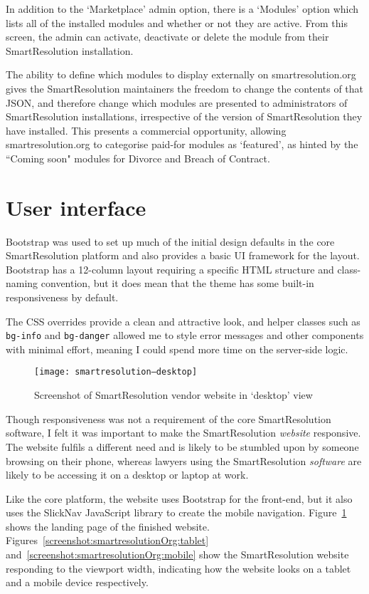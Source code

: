 In addition to the `Marketplace' admin option, there is a `Modules' option which lists all of the installed modules and whether or not they are active. From this screen, the admin can activate, deactivate or delete the module from their SmartResolution installation.

The ability to define which modules to display externally on smartresolution.org gives the SmartResolution maintainers the freedom to change the contents of that JSON, and therefore change which modules are presented to administrators of SmartResolution installations, irrespective of the version of SmartResolution they have installed. This presents a commercial opportunity, allowing smartresolution.org to categorise paid-for modules as `featured', as hinted by the ``Coming soon" modules for Divorce and Breach of Contract.

\section{User interface}

Bootstrap was used to set up much of the initial design defaults in the core SmartResolution platform and also provides a basic UI framework for the layout. Bootstrap has a 12-column layout requiring a specific HTML structure and class-naming convention, but it does mean that the theme has some built-in responsiveness by default.

The CSS overrides provide a clean and attractive look, and helper classes such as \lstinline{bg-info} and \lstinline{bg-danger} allowed me to style error messages and other components with minimal effort, meaning I could spend more time on the server-side logic.

\begin{figure}[h!]
  \centering
    \ifimages
    \texttt{[image: smartresolution--desktop]}
    \fi
  \caption{Screenshot of SmartResolution vendor website in `desktop' view}
  \label{screenshot:smartresolutionOrg:desktop}
\end{figure}

Though responsiveness was not a requirement of the core SmartResolution software, I felt it was important to make the SmartResolution \emph{website} responsive. The website fulfils a different need and is likely to be stumbled upon by someone browsing on their phone, whereas lawyers using the SmartResolution \emph{software} are likely to be accessing it on a desktop or laptop at work.

Like the core platform, the website uses Bootstrap for the front-end, but it also uses the SlickNav JavaScript library to create the mobile navigation. Figure~\ref{screenshot:smartresolutionOrg:desktop} shows the landing page of the finished website. Figures~\ref{screenshot:smartresolutionOrg:tablet} and~\ref{screenshot:smartresolutionOrg:mobile} show the SmartResolution website responding to the viewport width, indicating how the website looks on a tablet and a mobile device respectively.


